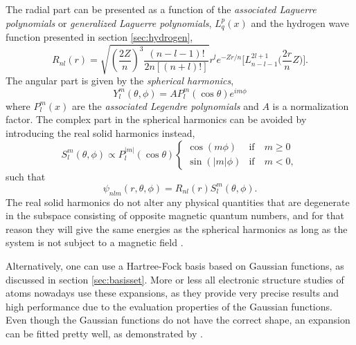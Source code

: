 The radial part can be presented as a function of the \textit{associated Laguerre polynomials} or \textit{generalized Laguerre polynomials}, $L_{q}^p(x)$ and the hydrogen wave function presented in section \ref{sec:hydrogen},
\begin{equation}
R_{nl}(r)=\sqrt{\left(\frac{2Z}{n}\right)^3\frac{(n-l-1)!}{2n[(n+l)!]}} r^le^{-Zr/n}\Big[L_{n-l-1}^{2l+1}\Big(\frac{2r}{n}Z\Big)\Big].
\end{equation}
The angular part is given by the \textit{spherical harmonics},
\begin{equation}
Y_l^m(\theta,\phi)=A P_l^m(\cos\theta)e^{im\phi}
\end{equation}
where $P_l^m(x)$ are the \textit{associated Legendre polynomials} and $A$ is a normalization factor. The complex part in the spherical harmonics can be avoided by introducing the real solid harmonics instead,
\begin{equation}
\label{eq:V_ext}
S_l^m(\theta,\phi)\propto P_l^{|m|}(\cos\theta)
\begin{cases} 
\cos(m\phi) & \text{if} \quad m\geq0 \\
\sin(|m|\phi) & \text{if} \quad m<0,
\end{cases}
\end{equation}
such that
\begin{equation}
\psi_{nlm}(r,\theta,\phi)= R_{nl}(r)S_l^m(\theta,\phi).
\label{eq:hydrogenlikesolid}
\end{equation}
The real solid harmonics do not alter any physical quantities that are degenerate in the subspace consisting of opposite magnetic quantum numbers, and for that reason they will give the same energies as the spherical harmonics as long as the system is not subject to a magnetic field \supercite{morten_hjorth-jensen_computational_2019}.

Alternatively, one can use a Hartree-Fock basis based on Gaussian functions, as discussed in section \ref{sec:basisset}. More or less all electronic structure studies of atoms nowadays use these expansions, as they provide very precise results and high performance due to the evaluation properties of the Gaussian functions. Even though the Gaussian functions do not have the correct shape, an expansion can be fitted pretty well, as demonstrated by \citet{hehre_selfconsistent_1969}.

